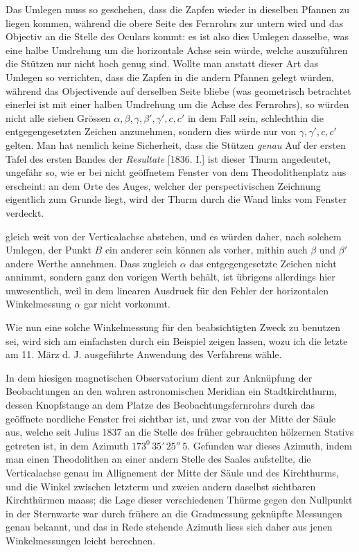 Das Umlegen muss so geschehen, dass die Zapfen wieder in dieselben Pfannen zu liegen kommen, während die obere Seite des Fernrohrs zur untern wird und das Objectiv an die Stelle des Oculars kommt: es ist also dies Umlegen dasselbe, was eine halbe Umdrehung um die horizontale Achse sein würde, welche auszuführen die Stützen nur nicht hoch genug sind. Wollte man anstatt dieser Art das Umlegen so verrichten, dass die Zapfen in die andern Pfannen gelegt würden, während das Objectivende auf derselben Seite bliebe (was geometrisch betrachtet einerlei ist mit einer halben Umdrehung um die Achse des Fernrohrs), so würden nicht alle sieben Grössen $\alpha,\beta,\gamma,\beta',\gamma',c,c'$ in dem Fall sein, schlechthin die entgegengesetzten Zeichen anzunehmen, sondern dies würde nur von $\gamma,\gamma',c,c'$ gelten. Man hat nemlich keine Sicherheit, dass die Stützen \textit{genau}
\expandafter\def\csname HistoricalNoteText445\endcsname{Auf der ersten Tafel des ersten Bandes der \textit{Resultate} [1836. I.] ist dieser Thurm angedeutet, ungefähr so, wie er bei nicht geöffnetem Fenster von dem Theodolithenplatz aus erscheint: an dem Orte des Auges, welcher der perspectivischen Zeichnung eigentlich zum Grunde liegt, wird der Thurm durch die Wand links vom Fenster verdeckt.}%
\par\clearpage
{}
\noindent gleich weit von der Verticalachse abstehen, und es würden daher, nach solchem Umlegen, der Punkt $B$ ein anderer sein können als vorher, mithin auch $\beta$ und $\beta'$ andere Werthe annehmen. Dass zugleich $\alpha$ das entgegengesetzte Zeichen nicht annimmt, sondern ganz den vorigen Werth behält, ist übrigens allerdings hier unwesentlich, weil in dem linearen Ausdruck für den Fehler der horizontalen Winkelmessung $\alpha$ gar nicht vorkommt.

Wie nun eine solche Winkelmessung für den beabsichtigten Zweck zu benutzen sei, wird sich am einfachsten durch ein Beispiel zeigen lassen, wozu ich die letzte am 11. März d. J. ausgeführte Anwendung des Verfahrens wähle.

In dem hiesigen magnetischen Observatorium dient zur Anknüpfung der Beobachtungen an den wahren astronomischen Meridian ein Stadtkirchthurm, dessen Knopfstange an dem Platze des Beobachtungsfernrohrs durch das geöffnete nordliche Fenster frei sichtbar ist, und zwar von der Mitte der Säule aus, welche seit Julius 1837 an die Stelle des früher gebrauchten hölzernen Stativs getreten ist, in dem Azimuth $173^0\,35'\,25''\,5$. Gefunden war dieses Azimuth, indem man einen Theodolithen an einer andern Stelle des Saales aufstellte, die Verticalachse genau im Allignement der Mitte der Säule und des Kirchthurms, und die Winkel zwischen letzterm und zweien andern daselbst sichtbaren Kirchthürmen maass; die Lage dieser verschiedenen Thürme gegen den Nullpunkt in der Sternwarte war durch frühere an die Gradmessung geknüpfte Messungen genau bekannt, und das in Rede stehende Azimuth liess sich daher aus jenen Winkelmessungen leicht berechnen.

